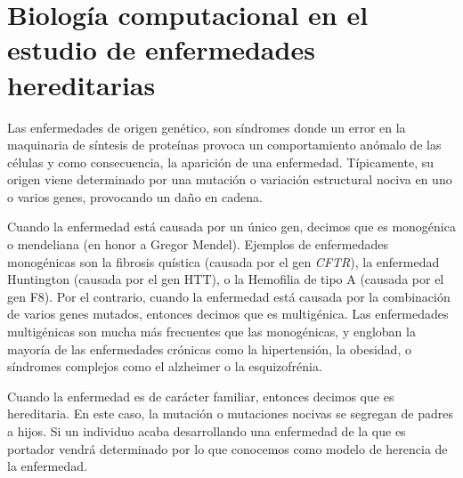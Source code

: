 \section{Biología computacional en el estudio de enfermedades hereditarias}

Las enfermedades de origen genético, son síndromes donde un error en la maquinaria de síntesis de proteínas provoca un comportamiento anómalo de las células y como consecuencia, la aparición de una enfermedad. Típicamente, su origen viene determinado por una mutación o variación estructural nociva en uno o varios genes, provocando un daño en cadena.

\medskip

Cuando la enfermedad está causada por un único gen, decimos que es monogénica o mendeliana (en honor a Gregor Mendel). Ejemplos de enfermedades monogénicas son la fibrosis quística (causada por el gen \textit{CFTR}), la enfermedad Huntington (causada por el gen HTT), o la Hemofilia de tipo A (causada por el gen F8). Por el contrario, cuando la enfermedad está causada por la combinación de varios genes mutados, entonces decimos que es multigénica. Las enfermedades multigénicas son mucha más frecuentes que las monogénicas, y engloban la mayoría de las enfermedades crónicas como la hipertensión, la obesidad, o síndromes complejos como el alzheimer o la esquizofrénia. 

\medskip
Cuando la enfermedad es de carácter familiar, entonces decimos que es hereditaria. En este caso, la mutación o mutaciones nocivas se segregan de padres a hijos. Si un individuo acaba desarrollando una enfermedad de la que es portador vendrá determinado por lo que conocemos como modelo de herencia de la enfermedad. 

